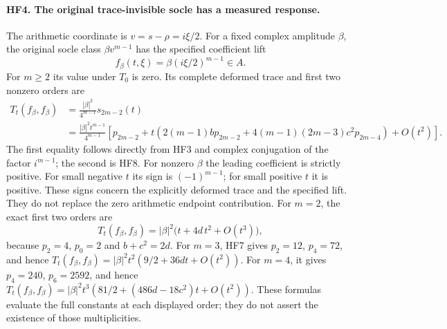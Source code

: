 \documentclass[11pt,a4paper]{article}
\theoremstyle{definition}\newtheorem{definition}[theorem]{Definition}
\begin{document}
\paragraph{HF4. The original trace-invisible socle has a measured response.}
The arithmetic coordinate is $v=s-\rho=i\xi/2$. For a fixed
complex amplitude $\beta$, the original socle class
$\beta v^{m-1}$ has the specified coefficient lift
\[
 f_\beta(t,\xi)=\beta(i\xi/2)^{m-1}\in A.
 \tag{HF9}
\]
For $m\ge2$ its value under $T_0$ is zero. Its complete deformed
trace and first two nonzero orders are
\[
 \begin{split}
 T_t(f_\beta,f_\beta)
   &=\frac{|\beta|^2}{4^{m-1}}s_{2m-2}(t)\\
   &=\frac{|\beta|^2t^{m-1}}{4^{m-1}}
       \left[p_{2m-2}+t\left(
           2(m-1)b p_{2m-2}
          +4(m-1)(2m-3)c^2p_{2m-4}\right)+O(t^2)\right].
 \end{split}
 \tag{HF10}
\]
The first equality follows directly from HF3 and complex conjugation
of the factor $i^{m-1}$; the second is HF8. For nonzero $\beta$
the leading coefficient is strictly positive. For small negative
$t$ its sign is $(-1)^{m-1}$; for small positive $t$ it is positive.
These signs concern the explicitly deformed trace and the specified
lift. They do not replace the zero arithmetic endpoint contribution.
For $m=2$, the exact first two orders are
\[
 T_t(f_\beta,f_\beta)
   =|\beta|^2\bigl(t+4d\,t^2+O(t^3)\bigr),
 \tag{HF11}
\]
because $p_2=4$, $p_0=2$ and $b+c^2=2d$.
For $m=3$, HF7 gives $p_2=12$, $p_4=72$, and hence
$T_t(f_\beta,f_\beta)=|\beta|^2t^2(9/2+36dt+O(t^2))$.
For $m=4$, it gives $p_4=240$, $p_6=2592$, and hence
$T_t(f_\beta,f_\beta)=|\beta|^2t^3(81/2+(486d-18c^2)t+O(t^2))$.
These formulas evaluate the full constants at each displayed order;
they do not assert the existence of those multiplicities.
\end{document}
